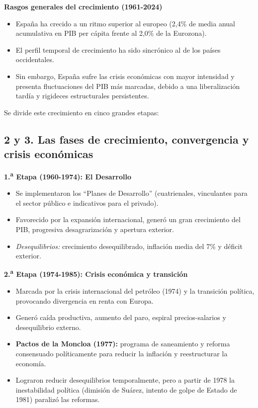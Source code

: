 \textbf{Rasgos generales del crecimiento (1961-2024)}

\begin{itemize}
  \item España ha crecido a un ritmo superior al europeo (2,4\% de media anual acumulativa en PIB per cápita frente al 2,0\% de la Eurozona).
  \item El perfil temporal de crecimiento ha sido sincrónico al de los países occidentales.
  \item Sin embargo, España sufre las crisis económicas con mayor intensidad y presenta fluctuaciones del PIB más marcadas, debido a una liberalización tardía y rigideces estructurales persistentes.
\end{itemize}

Se divide este crecimiento en cinco grandes etapas:

\subsection*{2 y 3. Las fases de crecimiento, convergencia y crisis económicas}

\textbf{1.\textsuperscript{a} Etapa (1960-1974): El Desarrollo}

\begin{itemize}
  \item Se implementaron los ``Planes de Desarrollo'' (cuatrienales, vinculantes para el sector público e indicativos para el privado).
  \item Favorecido por la expansión internacional, generó un gran crecimiento del PIB, progresiva desagrarización y apertura exterior.
  \item \textit{Desequilibrios:} crecimiento desequilibrado, inflación media del 7\% y déficit exterior.
\end{itemize}

\textbf{2.\textsuperscript{a} Etapa (1974-1985): Crisis económica y transición}

\begin{itemize}
  \item Marcada por la crisis internacional del petróleo (1974) y la transición política, provocando divergencia en renta con Europa.
  \item Generó caída productiva, aumento del paro, espiral precios-salarios y desequilibrio externo.
  \item \textbf{Pactos de la Moncloa (1977):} programa de saneamiento y reforma consensuado políticamente para reducir la inflación y reestructurar la economía.
  \item Lograron reducir desequilibrios temporalmente, pero a partir de 1978 la inestabilidad política (dimisión de Suárez, intento de golpe de Estado de 1981) paralizó las reformas.
\end{itemize}

